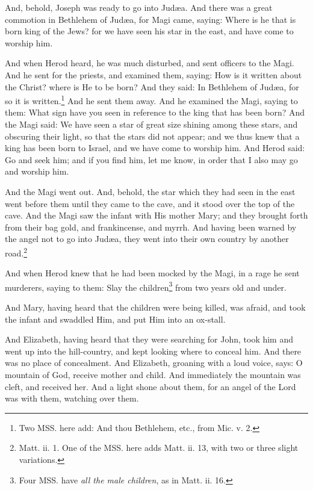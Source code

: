\pend\setcounter{pstartR}{1}\pstart
And, behold, Joseph was ready to go into Judæa. And there was a great commotion in Bethlehem of Judæa, for Magi came, saying: Where is he that is born king of the Jews? for we have seen his star in the east, and have come to worship him.

\pend\pstart
And when Herod heard, he was much disturbed, and sent officers to the Magi. And he sent for the priests, and examined them, saying: How is it written about the Christ? where is He to be born? And they said: In Bethlehem of Judæa, for so it is written.\footnote{Two MSS. here add: And thou Bethlehem, etc., from Mic. v. 2.} And he sent them away. And he examined the Magi, saying to them: What sign have you seen in reference to the king that has been born? And the Magi said: We have seen a star of great size shining among these stars, and obscuring their light, so that the stars did not appear; and we thus knew that a king has been born to Israel, and we have come to worship him. And Herod said: Go and seek him; and if you find him, let me know, in order that I also may go and worship him.

\pend\pstart
And the Magi went out. And, behold, the star which they had seen in the east went before them until they came to the cave, and it stood over the top of the cave. And the Magi saw the infant with His mother Mary; and they brought forth from their bag gold, and frankincense, and myrrh. And having been warned by the angel not to go into Judæa, they went into their own country by another road.\footnote{Matt. ii. 1. One of the MSS. here adds Matt. ii. 13, with two or three slight variations.}

\pend\pstart
{}

\pend\setcounter{pstartR}{1}\pstart
And when Herod knew that he had been mocked by the Magi, in a rage he sent murderers, saying to them: Slay the children\footnote{Four MSS. have \textit{all the male children}, as in Matt. ii. 16.} from two years old and under.

\pend\pstart
And Mary, having heard that the children were being killed, was afraid, and took the infant and swaddled Him, and put Him into an ox-stall.

\pend\pstart
And Elizabeth, having heard that they were searching for John, took him and went up into the hill-country, and kept looking where to conceal him. And there was no place of concealment. And Elizabeth, groaning with a loud voice, says: O mountain of God, receive mother and child. And immediately the mountain was cleft, and received her. And a light shone about them, for an angel of the Lord was with them, watching over them.

